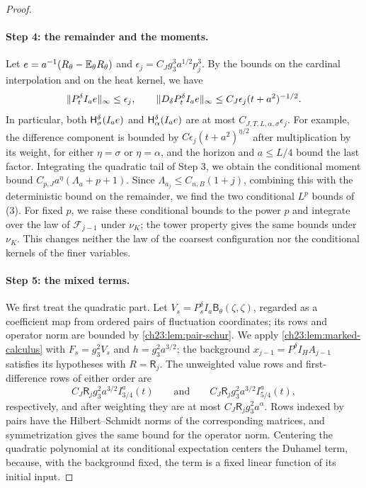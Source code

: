 \begin{proof}
\paragraph{Step 4: the remainder and the moments.}
Let $e=a^{-1}(R_\theta-\mathbb E_\theta R_\theta)$ and $\epsilon_j=C_Jg_3^3a^{1/2}p_j^3$. By the bounds on the cardinal interpolation and on the heat kernel, we have
\[
 \lVert P_t^\delta I_ae\rVert_\infty\le\epsilon_j,\qquad
 \lVert D_\delta P_t^\delta I_ae\rVert_\infty\le C_J\epsilon_j(t+a^2)^{-1/2}.
\]
In particular, both $\mathsf H_{\sigma}^{\delta}(I_ae)$ and $\mathsf H_{\alpha}^{\delta}(I_ae)$ are at most $C_{J,T,L,\alpha,\sigma}\epsilon_j$. For example, the difference component is bounded by $C\epsilon_j(t+a^2)^{\eta/2}$ after multiplication by its weight, for either $\eta=\sigma$ or $\eta=\alpha$, and the horizon and $a\le L/4$ bound the last factor. Integrating the quadratic tail of Step 3, we obtain the conditional moment bound $C_{p,J}a^\eta(\Lambda_a+p+1)$. Since $\Lambda_{a_j}\le C_{n,B}(1+j)$, combining this with the deterministic bound on the remainder, we find the two conditional $L^p$ bounds of (3). For fixed $p$, we raise these conditional bounds to the power $p$ and integrate over the law of $\mathcal F_{j-1}$ under $\nu_K$; the tower property gives the same bounds under $\nu_K$. This changes neither the law of the coarsest configuration nor the conditional kernels of the finer variables.

\paragraph{Step 5: the mixed terms.}
We first treat the quadratic part. Let $V_s=P_s^\delta I_a\mathsf B_\theta(\zeta,\zeta)$, regarded as a coefficient map from ordered pairs of fluctuation coordinates; its rows and operator norm are bounded by \cref{ch23:lem:pair-schur}. We apply \cref{ch23:lem:marked-calculus} with $F_s=g_3^2V_s$ and $h=g_3^2a^{3/2}$; the background $x_{j-1}=P_\cdot^\delta I_HA_{j-1}$ satisfies its hypotheses with $R=\mathsf R_j$. The unweighted value rows and first-difference rows of either order are
\[
 C_J\mathsf R_jg_3^2a^{3/2}I_{3/4}^a(t)\qquad\text{and}\qquad C_J\mathsf R_jg_3^2a^{3/2}I_{5/4}^a(t),
\]
respectively, and after weighting they are at most $C_J\mathsf R_jg_3^2a^\alpha$. Rows indexed by pairs have the Hilbert--Schmidt norms of the corresponding matrices, and symmetrization gives the same bound for the operator norm. Centering the quadratic polynomial at its conditional expectation centers the Duhamel term, because, with the background fixed, the term is a fixed linear function of its initial input.


\end{proof}
